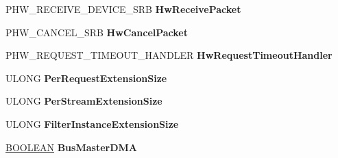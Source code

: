 \begin{DoxyCompactItemize}
\begin{tabbing}
\end{tabbing}\item 
\mbox{\label{struct___h_w___i_n_i_t_i_a_l_i_z_a_t_i_o_n___d_a_t_a_a5e41a539de27d7698c67819125b26477}} 
P\+H\+W\+\_\+\+R\+E\+C\+E\+I\+V\+E\+\_\+\+D\+E\+V\+I\+C\+E\+\_\+\+S\+RB {\bfseries Hw\+Receive\+Packet}
\item 
\mbox{\label{struct___h_w___i_n_i_t_i_a_l_i_z_a_t_i_o_n___d_a_t_a_a4028d061e1f5a54fde7bc617015d06bc}} 
P\+H\+W\+\_\+\+C\+A\+N\+C\+E\+L\+\_\+\+S\+RB {\bfseries Hw\+Cancel\+Packet}
\item 
\mbox{\label{struct___h_w___i_n_i_t_i_a_l_i_z_a_t_i_o_n___d_a_t_a_aa67122cfbd00914631981332fce09657}} 
P\+H\+W\+\_\+\+R\+E\+Q\+U\+E\+S\+T\+\_\+\+T\+I\+M\+E\+O\+U\+T\+\_\+\+H\+A\+N\+D\+L\+ER {\bfseries Hw\+Request\+Timeout\+Handler}
\item 
\mbox{\label{struct___h_w___i_n_i_t_i_a_l_i_z_a_t_i_o_n___d_a_t_a_a43e41c03f02768a6cae86c7666616dee}} 
U\+L\+O\+NG {\bfseries Per\+Request\+Extension\+Size}
\item 
\mbox{\label{struct___h_w___i_n_i_t_i_a_l_i_z_a_t_i_o_n___d_a_t_a_a2adb991cc73ee75583b8e6ef472f6956}} 
U\+L\+O\+NG {\bfseries Per\+Stream\+Extension\+Size}
\item 
\mbox{\label{struct___h_w___i_n_i_t_i_a_l_i_z_a_t_i_o_n___d_a_t_a_a656cbd695da965ac975fd1885a1409c3}} 
U\+L\+O\+NG {\bfseries Filter\+Instance\+Extension\+Size}
\item 
\mbox{\label{struct___h_w___i_n_i_t_i_a_l_i_z_a_t_i_o_n___d_a_t_a_a7af9a8c166eb6d932e36ef6e875d8734}} 
\hyperlink{_processor_bind_8h_a112e3146cb38b6ee95e64d85842e380a}{B\+O\+O\+L\+E\+AN} {\bfseries Bus\+Master\+D\+MA}
\item 
\mbox{\label{struct___h_w___i_n_i_t_i_a_l_i_z_a_t_i_o_n___d_a_t_a_ac128bd5c705b640668aca8ae8e8f7f04}} 

\end{DoxyCompactItemize}
